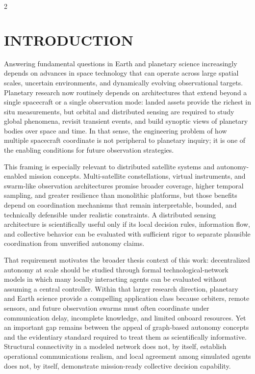 \documentclass[fleqn,10pt,letterpaper]{article}
\begin{document}
\begin{multicols}{2}
\setlength{\columnsep}{0.25in}

\section{INTRODUCTION}

Answering fundamental questions in Earth and planetary science increasingly depends on advances in space technology that can operate across large spatial scales, uncertain environments, and dynamically evolving observational targets. Planetary research now routinely depends on architectures that extend beyond a single spacecraft or a single observation mode: landed assets provide the richest in situ measurements, but orbital and distributed sensing are required to study global phenomena, revisit transient events, and build synoptic views of planetary bodies over space and time. In that sense, the engineering problem of how multiple spacecraft coordinate is not peripheral to planetary inquiry; it is one of the enabling conditions for future observation strategies.

This framing is especially relevant to distributed satellite systems and autonomy-enabled mission concepts. Multi-satellite constellations, virtual instruments, and swarm-like observation architectures promise broader coverage, higher temporal sampling, and greater resilience than monolithic platforms, but those benefits depend on coordination mechanisms that remain interpretable, bounded, and technically defensible under realistic constraints. A distributed sensing architecture is scientifically useful only if its local decision rules, information flow, and collective behavior can be evaluated with sufficient rigor to separate plausible coordination from unverified autonomy claims.

That requirement motivates the broader thesis context of this work: decentralized autonomy at scale should be studied through formal technological-network models in which many locally interacting agents can be evaluated without assuming a central controller. Within that larger research direction, planetary and Earth science provide a compelling application class because orbiters, remote sensors, and future observation swarms must often coordinate under communication delay, incomplete knowledge, and limited onboard resources. Yet an important gap remains between the appeal of graph-based autonomy concepts and the evidentiary standard required to treat them as scientifically informative. Structural connectivity in a modeled network does not, by itself, establish operational communications realism, and local agreement among simulated agents does not, by itself, demonstrate mission-ready collective decision capability.


\end{multicols}
\end{document}
